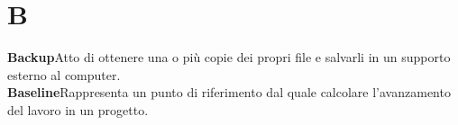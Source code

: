 \newpage
\section{B}\label{l:B}
\textbf{Backup}\newline Atto di ottenere una o più copie dei propri file e salvarli in un supporto esterno al computer.\\
\newline
\textbf{Baseline}\newline Rappresenta un punto di riferimento dal quale calcolare l'avanzamento del lavoro in un progetto.